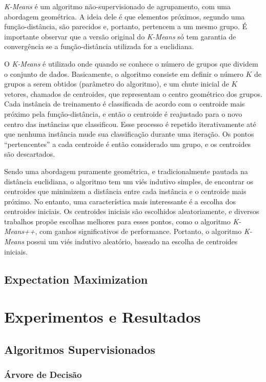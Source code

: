 \documentclass{article}
\begin{document}
{\it K-Means} é um algoritmo não-supervisionado de agrupamento, com uma abordagem geométrica.
A ideia dele é que elementos próximos, segundo uma função-distância, são parecidos e, portanto, pertencem a um mesmo grupo.
É importante observar que a versão original do {\it K-Means} só tem garantia de convergência se a função-distância utilizada for a euclidiana.

O {\it K-Means} é utilizado onde quando se conhece o número de grupos que dividem o conjunto de dados.
Basicamente, o algoritmo consiste em definir o número $K$ de grupos a serem obtidos (parâmetro do algoritmo),
e um chute inicial de $K$ vetores, chamados de centroides,
que representam o centro geométrico dos grupos.
Cada instância de treinamento é classificada de acordo com o centroide mais próximo pela função-distância,
e então o centroide é reajustado para o novo centro das instâncias que classificou.
Esse processo é repetido iterativamente até que nenhuma instância mude sua classificação durante uma iteração.
Os pontos ``pertencentes'' a cada centroide é então considerado um grupo,
e os centroides são descartados.

Sendo uma abordagem puramente geométrica,
e tradicionalmente pautada na distância euclidiana,
o algoritmo tem um viés indutivo simples,
de encontrar os centroides que minimizem a distância entre cada instância e o centroide mais próximo.
No entanto, uma característica mais interessante é a escolha dos centroides iniciais.
Os centroides iniciais são escolhidos aleatoriamente,
e diversos trabalhos propõe escolhas melhores para esses pontos,
como o algoritmo {\it K-Means++}, com ganhos significativos de performance.
Portanto, o algoritmo {\it K-Means} possui um viés indutivo
aleatório, baseado na escolha de centroides iniciais.


\subsection{{Expectation Maximization}}

\section{Experimentos e Resultados}

\subsection{Algoritmos Supervisionados}

\subsubsection{Árvore de Decisão}
\end{document}
